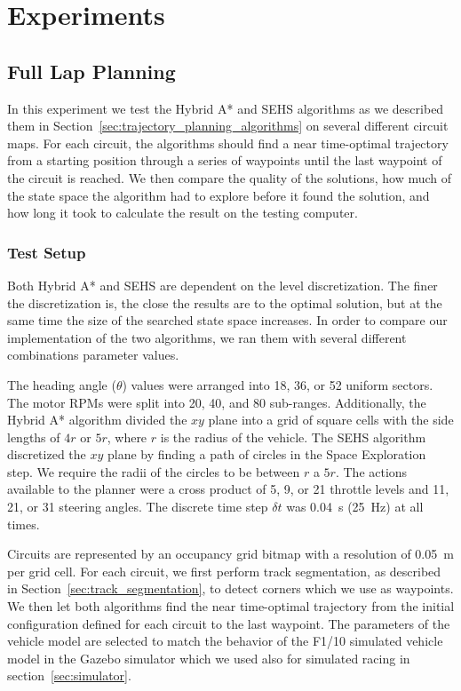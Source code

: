 \chapter{Experiments}
\label{chapter:experiments}

\section{Full Lap Planning}

In this experiment we test the Hybrid A* and \gls{SEHS} algorithms as we described them in Section~\ref{sec:trajectory_planning_algorithms} on several different circuit maps. For each circuit, the algorithms should find a near time-optimal trajectory from a starting position through a series of waypoints until the last waypoint of the circuit is reached. We then compare the quality of the solutions, how much of the state space the algorithm had to explore before it found the solution, and how long it took to calculate the result on the testing computer.

\subsection{Test Setup}

Both Hybrid A* and \gls*{SEHS} are dependent on the level discretization. The finer the discretization is, the close the results are to the optimal solution, but at the same time the size of the searched state space increases. In order to compare our implementation of the two algorithms, we ran them with several different combinations parameter values.

The heading angle ($\theta$) values were arranged into \num{18}, \num{36}, or \num{52} uniform sectors. The motor \gls*{RPM}s were split into \num{20}, \num{40}, and \num{80} sub-ranges. Additionally, the Hybrid A* algorithm divided the $xy$ plane into a grid of square cells with the side lengths of $4r$ or $5r$, where $r$ is the radius of the vehicle. The \gls*{SEHS} algorithm discretized the $xy$ plane by finding a path of circles in the Space Exploration step. We require the radii of the circles to be between $r$ a $5r$. The actions available to the planner were a cross product of \num{5}, \num{9}, or \num{21} throttle levels and \num{11}, \num{21}, or \num{31} steering angles. The discrete time step $\delta t$ was \SI{0.04}{\second} (\SI{25}{\hertz}) at all times.

Circuits are represented by an occupancy grid bitmap with a resolution of \SI{0.05}{\meter} per grid cell. For each circuit, we first perform track segmentation, as described in Section~\ref{sec:track_segmentation}, to detect corners which we use as waypoints. We then let both algorithms find the near time-optimal trajectory from the initial configuration defined for each circuit to the last waypoint. The parameters of the vehicle model are selected to match the behavior of the F1/10 simulated vehicle model in the Gazebo simulator which we used also for simulated racing in section~\ref{sec:simulator}.

